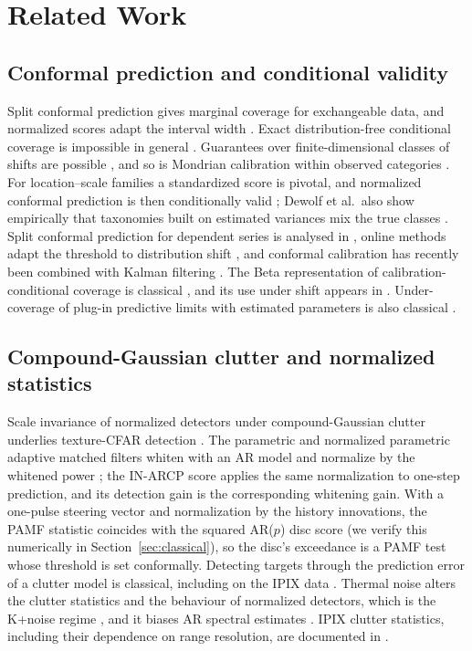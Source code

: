 \documentclass[journal]{IEEEtran}
\begin{document}
\section{Related Work}
\subsection{Conformal prediction and conditional validity}
Split conformal prediction gives marginal coverage for exchangeable data, and normalized scores adapt the interval width \cite{lei2018}. Exact distribution-free conditional coverage is impossible in general \cite{barber2021limits}. Guarantees over finite-dimensional classes of shifts are possible \cite{gibbs2025}, and so is Mondrian calibration within observed categories \cite{vovk2012,bostrom2020}. For location--scale families a standardized score is pivotal, and normalized conformal prediction is then conditionally valid \cite{dewolf2025}; Dewolf et al.\ also show empirically that taxonomies built on estimated variances mix the true classes \cite[\S5.2]{dewolf2025}. Split conformal prediction for dependent series is analysed in \cite{barber2023,barber2026,zhai2026}, online methods adapt the threshold to distribution shift \cite{gibbs2021aci,xu2023spci}, and conformal calibration has recently been combined with Kalman filtering \cite{weisman2026ckf}. The Beta representation of calibration-conditional coverage is classical \cite{vovk2012}, and its use under shift appears in \cite{ramos2026}. Under-coverage of plug-in predictive limits with estimated parameters is also classical \cite{barndorff1996,lawless2005,vidoni2009}.

\subsection{Compound-Gaussian clutter and normalized statistics}
Scale invariance of normalized detectors under compound-Gaussian clutter underlies texture-CFAR detection \cite{conte1995,kraut1999,ollila2012,sangston2012}. The parametric and normalized parametric adaptive matched filters whiten with an AR model and normalize by the whitened power \cite{roman2000,michels2000}; the IN-ARCP score applies the same normalization to one-step prediction, and its detection gain is the corresponding whitening gain. With a one-pulse steering vector and normalization by the history innovations, the PAMF statistic coincides with the squared AR($p$) disc score (we verify this numerically in Section~\ref{sec:classical}), so the disc's exceedance is a PAMF test whose threshold is set conformally. Detecting targets through the prediction error of a clutter model is classical, including on the IPIX data \cite{haykin1995}. Thermal noise alters the clutter statistics and the behaviour of normalized detectors, which is the K+noise regime \cite{watts1987,gini1997,watts2007cfarloss,ward2013}, and it biases AR spectral estimates \cite{kay1980}. IPIX clutter statistics, including their dependence on range resolution, are documented in \cite{farina1997,conte2004resolution}.
\end{document}
